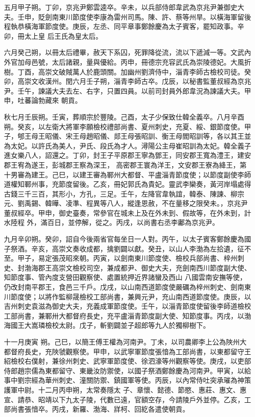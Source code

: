 \begin{pinyinscope}
 五月甲子朔。丁卯，京兆尹鄭雲逵卒。辛未，以兵部侍郎韋武為京兆尹兼御史大夫。壬申，貶劍南東川節度使李康為雷州司馬。陳、許、蔡等州旱。以橫海軍留後程執恭橫海軍節度使。庚辰，左丞、同平章事鄭餘慶為太子賓客，罷知政事。辛卯，冊太上皇
 后王氏為皇太后。



 六月癸己朔，以冊太后禮畢，赦天下系囚，死罪降從流，流以下遞減一等。文武內外官加母邑號，太后諸親，量與優給。丙申，冊德宗充容武氏為崇陵德妃。大風折樹。丁酉，高崇文破賊萬人於鹿頭關。加幽州劉濟侍中，淄青李師古檢校司徒。癸卯，高崇文收漢州。閏六月壬子朔，淄青李師古卒。戊辰，以秘書監董叔經為京兆尹。壬午，諫議大夫去左、右字，只置四員。以前司封員外郎韋況為諫議大夫。甲申，吐蕃論勃藏來
 朝貢。



 秋七月壬辰朔。壬寅，葬順宗於豐陵。己酉，太子少保致仕韓全義卒。八月辛酉朔。癸亥，以左衛大將軍李願檢校禮部尚書、夏州刺史，充夏、綏、銀節度使。甲子，郇王母王昭儀、宋王母趙昭儀、郯王母張昭訓、衡王母閻昭訓等，各以其王並為太妃。以許氏為美人，尹氏、段氏為才人。潯陽公主母崔昭訓為太妃。韓全義子進女樂八人，詔還之。丁卯，封王子平原郡王寧為鄧王，同安郡王寬為澧王，建安郡王宥為遂王，彭城郡王察為深王，
 高密郡王寰為洋王，文安郡王寮為絳王，第十男審為建王。己巳，以建王審為鄆州大都督、平盧淄青節度使；以節度副使李師道權知鄆州事，充節度留後。乙亥，冊妃郭氏為貴妃。靈武李欒奏，黃河岸塌處得古錢三千三百，其形小，方孔，三足。壬午，左降官韋執誼，韓泰、陳諫、柳宗元、劉禹錫、韓曄、凌準、程異等八人，縱逢恩赦，不在量移之限癸未。，京兆尹董叔經卒。甲申，御史臺奏，常參官在城未上及在外未到、假故等，在外未到，計水陸程
 外，滿百日，並停解，從之。丙戌，以尚書右丞李鄘為京兆尹。



 九月辛卯朔。癸卯，詔自今後兩省官每坐日一人對。丙午，以太子賓客鄭餘慶為國子祭酒。辛亥，高崇文奏收成都，擒劉闢以獻。癸丑，以山人李渤為左拾遺，征不至。甲子，易定張茂昭來朝。丙寅，以劍南東川節度使、檢校兵部尚書、梓州刺史、封渤海郡王高崇文檢校司空，兼成都尹、御史大夫，充劍南西川節度副大使、知節度事、管內度支營田觀察使、處置統押近界諸蠻及西山
 八國雲南安撫等使，仍改封南平郡王，食邑三千戶。戊戌，以山南西道節度使嚴礪為梓州刺史、劍南東川節度使；以將作監柳晟檢校工部尚書，兼興元尹，充山南西道節度使。庚辰，以吉州刺史袁滋為御史大夫，充義成軍節度使。壬午，以淄青節度使留後李師道檢校工部尚書，兼鄆卅大都督府長史，充平盧淄青節度副大使、知節度事。丙戌，以渤海國王大嵩璘檢校太尉。戊子，斬劉闢並子超郎等九人於獨柳樹下。



 十一月庚寅
 朔。己巳，以簡王傅王權為河南尹。丁未，以司農卿李上公為陜州大都督府長史，充陜虢觀察使。甲申，以武寧軍節度張愔為工部尚書，以東都留守王紹檢校右僕射，兼徐州刺史、武寧軍節度使、徐泗濠等州觀察等使。庚戌，以吏部侍郎趙宗儒為東都留守、東畿汝防禦使，以國子祭酒鄭餘慶為河南尹。甲寅，以給事中劉宗經為華州刺史、潼關防禦、鎮國軍等使。丙辰，以內常侍吐突承璀為神策護軍中尉。十二月丙申朔，太常奏隱太
 子、章懷、懿德、節愍、惠莊、惠文、惠宣、請恭、昭靖以下九太子陵，代數已遠，官額空存，今請陵戶外並停。乙亥，工部尚書張愔卒。丙戌，新羅、渤海、牂柯、回紇各遣使朝貢。




\end{pinyinscope}
